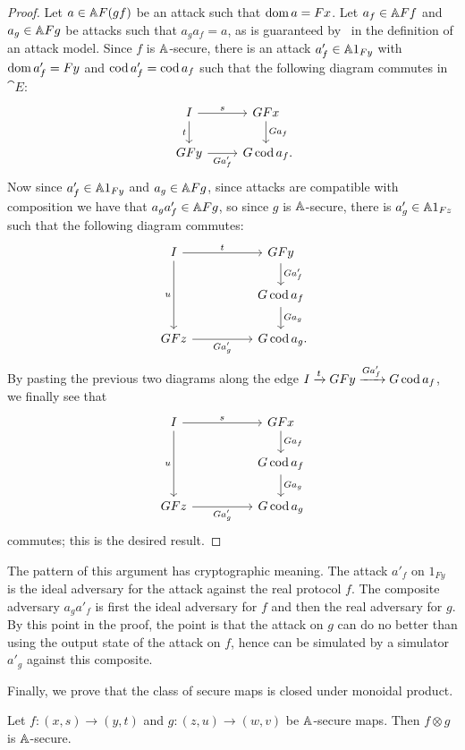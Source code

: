 \begin{proof}
  Let $a\in\AA F(gf)$ be an attack such that $\dom a = Fx$. Let
  $a_f\in\AA Ff$ and $a_g\in\AA Fg$ be attacks such that $a_ga_f = a$, as is
  guaranteed by~ in the definition of an attack
  model. Since $f$ is $\AA$-secure, there is an attack
  $a_f'\in\AA 1_{Fy}$ with $\dom a_f' = Fy$ and $\cod a_f'
  = \cod a_f$ such that the following diagram commutes in $\cat{E}$: \[
    \begin{tikzcd}
      I\ar[r, "s"]\ar[d, "t"'] & GFx\ar[d, "Ga_f"]\\
      GFy\ar[r, "Ga_f'"'] & G\cod a_f\punctuation{.}
    \end{tikzcd}
  \]
  Now since $a'_f\in\AA 1_{Fy}$ and $a_g\in\AA Fg$, since attacks are
  compatible with composition we have that $a_ga_f'\in\AA Fg$, so since $g$ is
  $\AA$-secure, there is $a_g'\in \AA 1_{Fz}$ such that the following diagram
  commutes: \[
    \begin{tikzcd}
      I\ar[rr, "t"]\ar[dd, "u"'] && GFy\ar[d, "Ga_f'"]\\
                                && G\cod a_f\ar[d, "Ga_g"] \\
      GFz\ar[rr, "Ga_g'"'] && G\cod a_g\punctuation{.}
    \end{tikzcd}
  \] By pasting the previous two diagrams along the edge $I\xto{t}
  GFy\xto{Ga'_f} G\cod a_f$, we finally see that \[
    \begin{tikzcd}
      I\ar[rr, "s"]\ar[dd, "u"'] && GFx\ar[d, "Ga_f"]\\
                                && G\cod a_f\ar[d, "Ga_g"] \\
      GFz\ar[rr, "Ga_g'"'] && G\cod a_g
    \end{tikzcd}
  \]commutes; this is the desired result.
\end{proof}

The pattern of this argument has cryptographic meaning. The attack $a'_f$ on
$1_{Fy}$ is the ideal adversary for the attack against the real protocol $f$.
The composite adversary $a_ga'_f$ is first the ideal adversary for $f$ and then
the real adversary for $g$. By this point in the proof, the point is that the
attack on $g$ can do no better than using the output state of the attack on
$f$, hence can be simulated by a simulator $a'_g$ against this composite.

Finally, we prove that the class of secure maps is closed under monoidal
product.

\begin{lemma}\label{thm:closed-under-monoidal}
  Let $f: (x, s)\to (y, t)$ and $g: (z, u)\to (w, v)$ be $\AA$-secure maps.
  Then $f\otimes g$ is $\AA$-secure.
\end{lemma}

